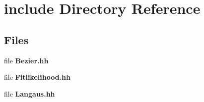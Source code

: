 \section{include Directory Reference}
\label{dir_9fc850109578481a13dc34ece2be5d36}
\subsection*{Files}
\begin{DoxyCompactItemize}
\item 
file {\bfseries Bezier.\-hh}
\item 
file {\bfseries Fitlikelihood.\-hh}
\item 
file {\bfseries Langaus.\-hh}
\end{DoxyCompactItemize}
